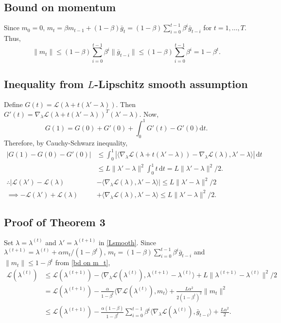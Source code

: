 \documentclass{statsoc}
\newcommand\df{{\text{d}}}
\newcommand\mL{{\mathcal{L}}}
\begin{document}
\subsection{Bound on momentum} \label{bound on momentum}
Since $m_0 = 0$, $m_t = \beta m_{t-1} + (1-\beta) \bar{g}_{t} 
= (1-\beta) \sum_{i=0}^{t-1} \beta^i \bar{g}_{t-i}$ for  $t=1, \dots, T$. Thus,
\begin{equation} \label{bd on m_t}
\|m_t\|  \leq (1-\beta) \sum_{i=0}^{t-1} \beta^{i} \|\bar{g}_{t-i}\|
\leq (1-\beta) \sum_{i=0}^{t-1} \beta^i 
= 1-\beta^t. 
\end{equation}


\subsection{Inequality from $L$-Lipschitz smooth assumption}
Define $G(t) = \mL(\lambda + t(\lambda'-\lambda))$. Then $G'(t) = \nabla_\lambda \mL(\lambda + t(\lambda'-\lambda))^T (\lambda'-\lambda)$. Now,
\[
G(1)  = G(0) + G'(0) + \int_0^1 G'(t) - G'(0) \df t.
\]
Therefore, by Cauchy-Schwarz inequality, 
\begin{align} \label{Lsmooth}
|G(1) - G(0) -G'(0) | &\leq \int_0^1 | \langle \nabla_\lambda \mL(\lambda + t(\lambda'-\lambda)) - \nabla_\lambda \mL(\lambda), \lambda' - \lambda \rangle |\, \df t \nonumber \\
& \leq  L \|\lambda'-\lambda \|^2 \int_0^1 t \, \df t 
= L \|\lambda'-\lambda \|^2/2.\nonumber \\
\therefore  |\mL(\lambda') - \mL(\lambda) &-\langle \nabla_\lambda \mL(\lambda), \lambda' - \lambda \rangle |  \leq L \|\lambda'-\lambda \|^2/2 \nonumber \\ 
\implies  -\mL(\lambda') + \mL(\lambda) &+ \langle \nabla_\lambda \mL(\lambda), \lambda' - \lambda \rangle \leq L \|\lambda'-\lambda \|^2/2.
\end{align}


\subsection{Proof of Theorem 3}
Set $\lambda=\lambda^{(t)}$ and $\lambda'=\lambda^{(t+1)}$ in \eqref{Lsmooth}. Since $\lambda^{(t+1)} = \lambda^{(t)} + \alpha m_t/(1-\beta^t)$, $m_t = (1-\beta) \sum_{i=0}^{t-1} \beta^i \bar{g}_{t-i}$ and $\|m_t\| \leq 1 -\beta^t$ from \eqref{bd on m_t},
\begin{align} \label{E1}
\mL(\lambda^{(t)}) & \leq \mL(\lambda^{(t+1)}) - \langle \nabla_\lambda \mL(\lambda^{(t)}), \lambda^{(t+1)}- \lambda^{(t)} \rangle  + L \| \lambda^{(t+1)}- \lambda^{(t)} \|^2/2 \nonumber \\
&= \mL(\lambda^{(t+1)}) - \frac{\alpha}{1-\beta^t} \langle \nabla \mL(\lambda^{(t)}),m_t \rangle  + \frac{L \alpha^2}{2(1-\beta^t)^2} \| m_t \|^2 \nonumber \\
& \leq \mL(\lambda^{(t+1)}) - \frac{\alpha (1-\beta)}{1-\beta^t} \sum_{i=0}^{t-1} \beta^i \langle \nabla_\lambda \mL(\lambda^{(t)}), \bar{g}_{t-i} \rangle + \frac{L \alpha^2}{2}.
\end{align}
\end{document}
